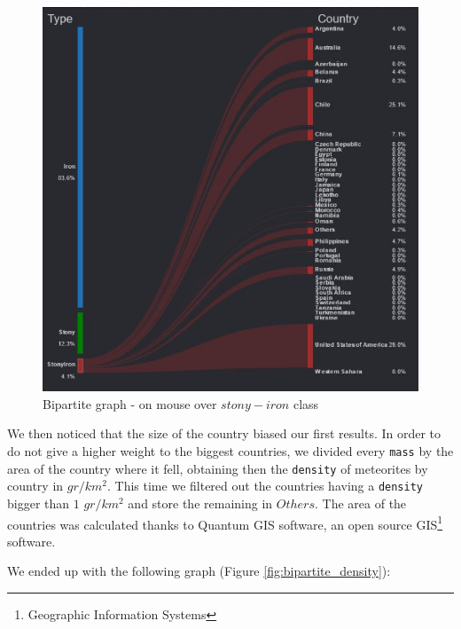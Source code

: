 \documentclass[10pt,conference,compsocconf]{IEEEtran}
\begin{document}
\begin{figure}[H]
  \centering
  \includegraphics[height=\columnwidth]{images/example_mouse_bipartite}
  \vspace{-3mm}
  \caption{Bipartite graph - on mouse over $stony-iron$ class}
  \label{fig:bipartite_mouse}
\end{figure}

We then noticed that the size of the country biased our first results. In order to do not give a higher weight to the biggest countries, we divided every \texttt{mass} by the area of the country where it fell, obtaining then the \texttt{density} of meteorites by country in $gr/km^{2}$. This time we filtered out the countries having a \texttt{density} bigger than $1$ $gr/km^{2}$ and store the remaining in $Others$. The area of the countries was calculated thanks to Quantum GIS software, an open source GIS\footnote{Geographic Information Systems} software. 

We ended up with the following graph (Figure \ref{fig:bipartite_density}): 
\end{document}
